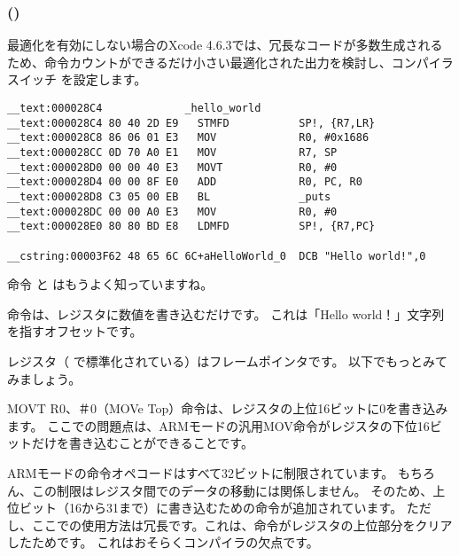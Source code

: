 \subsubsection{\OptimizingXcodeIV (\ARMMode)}

最適化を有効にしない場合のXcode 4.6.3では、冗長なコードが多数生成されるため、命令カウントができるだけ小さい最適化された出力を検討し、コンパイラスイッチ \Othree を設定します。

\begin{lstlisting}[caption=\OptimizingXcodeIV (\ARMMode),style=customasmARM]
__text:000028C4             _hello_world
__text:000028C4 80 40 2D E9   STMFD           SP!, {R7,LR}
__text:000028C8 86 06 01 E3   MOV             R0, #0x1686
__text:000028CC 0D 70 A0 E1   MOV             R7, SP
__text:000028D0 00 00 40 E3   MOVT            R0, #0
__text:000028D4 00 00 8F E0   ADD             R0, PC, R0
__text:000028D8 C3 05 00 EB   BL              _puts
__text:000028DC 00 00 A0 E3   MOV             R0, #0
__text:000028E0 80 80 BD E8   LDMFD           SP!, {R7,PC}

__cstring:00003F62 48 65 6C 6C+aHelloWorld_0  DCB "Hello world!",0
\end{lstlisting}

命令 と はもうよく知っていますね。


\MOV 命令は、レジスタに数値を書き込むだけです。 
これは「Hello world！」文字列を指すオフセットです。

レジスタ（ \IOSABI で標準化されている）はフレームポインタです。 以下でもっとみてみましょう。

MOVT R0、＃0（MOVe Top）命令は、レジスタの上位16ビットに0を書き込みます。 ここでの問題点は、ARMモードの汎用MOV命令がレジスタの下位16ビットだけを書き込むことができることです。

ARMモードの命令オペコードはすべて32ビットに制限されています。 もちろん、この制限はレジスタ間でのデータの移動には関係しません。 
そのため、上位ビット（16から31まで）に書き込むための命令が追加されています。 
ただし、ここでの使用方法は冗長です。これは、命令がレジスタの上位部分をクリアしたためです。 
これはおそらくコンパイラの欠点です。


